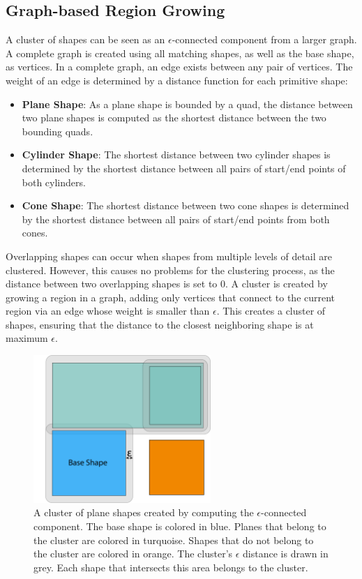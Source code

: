 \subsection{Graph-based Region Growing}
\label{sec:regionGrowing}

A cluster of shapes can be seen as an $\epsilon$-connected component from a larger graph. A complete graph is created using all matching shapes, as well as the base shape, as vertices. In a complete graph, an edge exists between any pair of vertices. The weight of an edge is determined by a distance function for each primitive shape:

\begin{itemize}
    \item \textbf{Plane Shape}: As a plane shape is bounded by a quad, the distance between two plane shapes is computed as the shortest distance between the two bounding quads.
    \item \textbf{Cylinder Shape}: The shortest distance between two cylinder shapes is determined by the shortest distance between all pairs of start/end points of both cylinders. 
  \item \textbf{Cone Shape}: The shortest distance between two cone shapes is determined by the shortest distance between all pairs of start/end points from both cones. 
\end{itemize}

Overlapping shapes can occur when shapes from multiple levels of detail are clustered. However, this causes no problems for the clustering process, as the distance between two overlapping shapes is set to $0$.
A cluster is created by growing a region in a graph, adding only vertices that connect to the current region via an edge whose weight is smaller than $\epsilon$. This creates a cluster of shapes, ensuring that the distance to the closest neighboring shape is at maximum $\epsilon$. 

\begin{figure}[h]
    \centering
    \includegraphics[width=0.6\textwidth]{Shape_Detection/regionGrowingPlanes.png}
    \caption[Exemplary $\epsilon$-connected plane cluster]
        {A cluster of plane shapes created by computing the $\epsilon$-connected component. The base shape is colored in blue. Planes that belong to the cluster are colored in turquoise. Shapes that do not belong to the cluster are colored in orange. The cluster's $\epsilon$ distance is drawn in grey. Each shape that intersects this area belongs to the cluster.}
    \label{fig:regionGrowingPlanes}
\end{figure}

